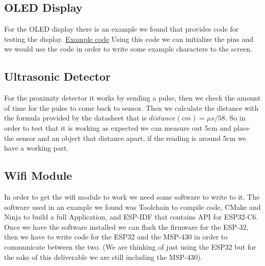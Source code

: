 \documentclass{article}
\begin{document}
\subsection{OLED Display}
For the OLED display there is an example we found that provides code for testing the display. \href{https://github.com/sdp8483/MSP430G2_SSD1306_OLED/blob/master/MSP430G2_SSD1306/i2c.c}{Example code} Using this code we can initialize the pins and we would use the code in order to write some example characters to the screen.
\subsection{Ultrasonic Detector}
For the proximity detector it works by sending a pulse, then we check the amount of time for the pulse to come back to sensor. Then we calculate the distance with the formula provided by the datasheet that is $distance(cm) = \mu s /58$. So in order to test that it is working as expected we can measure out 5cm and place the sensor and an object that distance apart, if the reading is around 5cm we have a working part.
\subsection{Wifi Module}
In order to get the wifi module to work we need some software to write to it. The software used in an example we found was Toolchain to compile code, CMake and Ninja to build a full Application, and ESP-IDF that contains API for ESP32-C6. Once we have the software installed we can flash the firmware for the ESP-32, then we have to write code for the ESP32 and the MSP-430 in order to communicate between the two. (We are thinking of just using the ESP32 but for the sake of this deliverable we are still including the MSP-430). 
\end{document}
